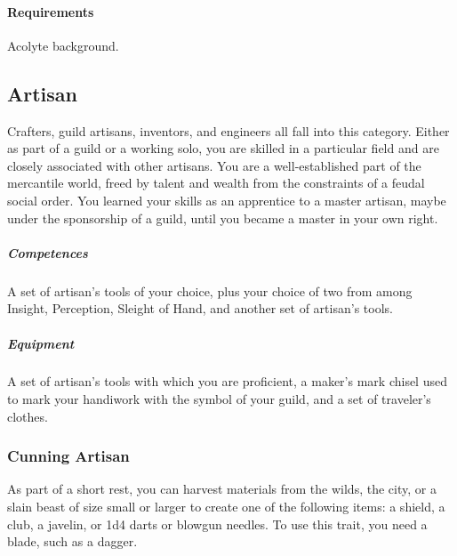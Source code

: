             \paragraph{Requirements} Acolyte background.
\subsection*{Artisan} \label{ssec::artisan}
    Crafters, guild artisans, inventors, and engineers all fall into this category.
    Either as part of a guild or a working solo, you are skilled in a particular field and are closely associated with other artisans.
    You are a well-established part of the mercantile world, freed by talent and wealth from the constraints of a feudal social order.
    You learned your skills as an apprentice to a master artisan, maybe under the sponsorship of a guild, until you became a master in your own right.

    \subparagraph{Competences} A set of artisan's tools of your choice, plus your choice of two from among Insight, Perception, Sleight of Hand, and another set of artisan's tools.

    \subparagraph{Equipment} A set of artisan's tools with which you are proficient, a maker's mark chisel used to mark your handiwork with the symbol of your guild, and a set of traveler's clothes.

    \subsubsection{Cunning Artisan} \label{feat::cunningartisan}
        As part of a short rest, you can harvest materials from the wilds, the city, or a slain beast of size small or larger to create one of the following items: a shield, a club, a javelin, or 1d4 darts or blowgun needles.
        To use this trait, you need a blade, such as a dagger.%

